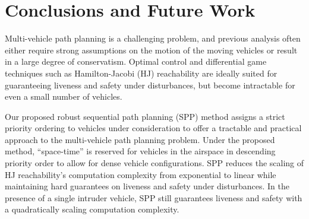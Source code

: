 \section{Conclusions and Future Work}
Multi-vehicle path planning is a challenging problem, and previous analysis often either require strong assumptions on the motion of the moving vehicles or result in a large degree of conservatism. Optimal control and differential game techniques such as Hamilton-Jacobi (HJ) reachability are ideally suited for guaranteeing liveness and safety under disturbances, but become intractable for even a small number of vehicles.

Our proposed robust sequential path planning (SPP) method assigns a strict priority ordering to vehicles under consideration to offer a tractable and practical approach to the multi-vehicle path planning problem. Under the proposed method, ``space-time'' is reserved for vehicles in the airspace in descending priority order to allow for dense vehicle configurations. SPP reduces the scaling of HJ reachability's computation complexity from exponential to linear while maintaining hard guarantees on liveness and safety under disturbances. In the presence of a single intruder vehicle, SPP still guarantees liveness and safety with a quadratically scaling computation complexity.

